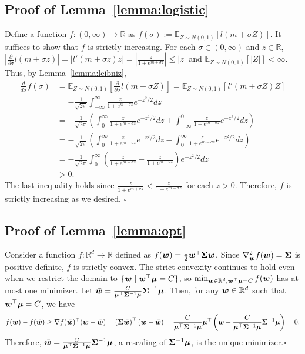 \subsection{Proof of Lemma~\ref{lemma:logistic}}
Define a function $f:(0,\infty) \rightarrow \mathbb{R}$ as $f(\sigma) := \mathbb{E}_{Z \sim N(0,1)}[l(m+\sigma Z)]$. It suffices to show that $f$ is strictly increasing. For each $\sigma \in (0,\infty)$ and $z \in \mathbb{R}$, $\left | \frac{\partial}{\partial \sigma} l(m+\sigma z) \right| = \left| l'(m+\sigma z) z \right|  = \left| \frac{z}{1+e^{m+\sigma z}} \right|\leq |z|$ and $\mathbb{E}_{Z \sim N(0,1)}[|Z|]< \infty$. Thus, by Lemma~\ref{lemma:leibniz}, 
\begin{align*}
    \frac{d}{d\sigma}f(\sigma) &= \mathbb{E}_{Z \sim N(0,1)}\left[\frac{\partial}{\partial \sigma} l(m+\sigma Z)\right] = \mathbb{E}_{Z \sim N(0,1)}[l'(m+\sigma Z) Z]\\
    &= - \frac{1}{\sqrt{2 \pi}} \int_{-\infty}^\infty \frac{z}{1+e^{m+\sigma z}}e^{-z^2/2}dz\\
     &= -\frac{1}{\sqrt{2 \pi}} \left( \int_0^\infty \frac{z}{1+e^{m+\sigma z}}e^{-z^2/2}dz + \int_{-\infty}^0 \frac{z}{1+e^{m-\sigma z}}e^{-z^2/2}dz \right)\\
    &= -\frac{1}{\sqrt{2 \pi}} \left( \int_0^\infty \frac{z}{1+e^{m+\sigma z}}e^{-z^2/2}dz - \int_0^\infty \frac{z}{1+e^{m-\sigma z}}e^{-z^2/2}dz \right)\\
    &= -\frac{1}{\sqrt{2 \pi}}  \int_0^\infty \left( \frac{z}{1+e^{m+\sigma z}}-\frac{z}{1+e^{m-\sigma z}} \right)e^{-z^2/2}dz\\
    &>0.
\end{align*}
The last inequality holds since $\frac{z}{1+e^{m+\sigma z}} < \frac{z}{1+e^{m-\sigma z}}$ for each $z>0$. Therefore, $f$ is strictly increasing as we desired. \hfill $\square$

\subsection{Proof of Lemma~\ref{lemma:opt}}
Consider a function $f : \mathbb{R}^d \rightarrow \mathbb{R}$ defined as $f({\bm{w}}) = \frac{1}{2} {\bm{w}}^\top {\bm{\Sigma}} {\bm{w}}$. Since $\nabla_{\bm{w}}^2 f({\bm{w}}) = {\bm{\Sigma}}$ is positive definite, $f$ is strictly convex. The strict convexity continues to hold even when we restrict the domain to $\{{\bm{w}} \mid {\bm{w}}^\top {\bm{\mu}} = C\}$, so $\min_{{\bm{w}} \in \mathbb{R}^d, {\bm{w}}^\top {\bm{\mu}} = C} f({\bm{w}})$ has at most one minimizer. Let $\bar{{\bm{w}}} = \frac{C}{ {\bm{\mu}}^\top {\bm{\Sigma}}^{-1} {\bm{\mu}}} {\bm{\Sigma}}^{-1} {\bm{\mu}}$. Then, for any ${\bm{w}}\in \mathbb{R}^d$ such that ${\bm{w}}^\top {\bm{\mu}} = C$, we have 
\begin{equation*}
    f({\bm{w}}) - f(\bar{{\bm{w}}}) \geq \nabla f(\bar{{\bm{w}}})^\top({\bm{w}} - \bar{{\bm{w}}})= \left({\bm{\Sigma}} \bar{{\bm{w}}}\right)^\top ({\bm{w}} - \bar{{\bm{w}}}) = \frac{C}{{\bm{\mu}}^\top {\bm{\Sigma}}^{-1} {\bm{\mu}}}{\bm{\mu}}^\top \left ({\bm{w}} - \frac{C}{{\bm{\mu}}^\top {\bm{\Sigma}}^{-1} {\bm{\mu}}}{\bm{\Sigma}}^{-1} {\bm{\mu}} \right) = 0.
\end{equation*}
Therefore, $\bar{{\bm{w}}} = \frac{C}{{\bm{\mu}}^\top {\bm{\Sigma}}^{-1} {\bm{\mu}}} {\bm{\Sigma}}^{-1} {\bm{\mu}}$, a rescaling of ${\bm{\Sigma}}^{-1} {\bm{\mu}}$, is the unique minimizer.\hfill $\square$